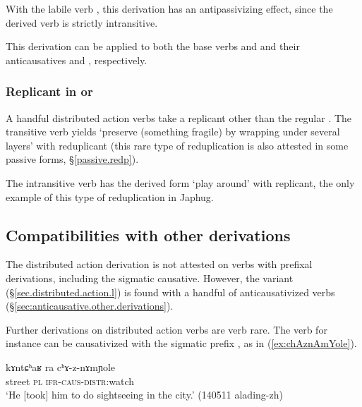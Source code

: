 With the labile verb , this derivation has an antipassivizing effect, since the derived verb  is strictly intransitive.

This derivation can be applied to both the base verbs and  and their anticausatives  and , respectively.

\subsubsection{Replicant in  or } \label{sec.distributed.action.oR}
A handful distributed action verbs take a replicant other than the regular . The transitive verb  yields  `preserve (something fragile) by wrapping under several layers' with  reduplicant (this rare type of reduplication is also attested in some passive forms, §\ref{passive.redp}).

The intransitive verb  has the derived form  `play around' with  replicant, the only example of this type of reduplication in Japhug.
\subsection{Compatibilities with other derivations} \label{sec:distributed.action.other}
The distributed action derivation is not attested on verbs with prefixal derivations, including the sigmatic causative. However, the  variant (§\ref{sec.distributed.action.l}) is found with a handful of anticausativized verbs (§\ref{sec:anticausative.other.derivations}).

Further derivations on distributed action verbs are verb rare. The verb  for instance can be causativized with the sigmatic prefix , as in (\ref{ex:chAznAmYole}).

\begin{exe}
\ex \label{ex:chAznAmYole}
\gll kɤntɕʰaʁ ra cʰɤ-z-nɤmɲole \\
street \textsc{pl} \textsc{ifr}-\textsc{caus}-\textsc{distr}:watch \\
\glt `He [took] him to do sightseeing in the city.' (140511 alading-zh) 
\end{exe}


